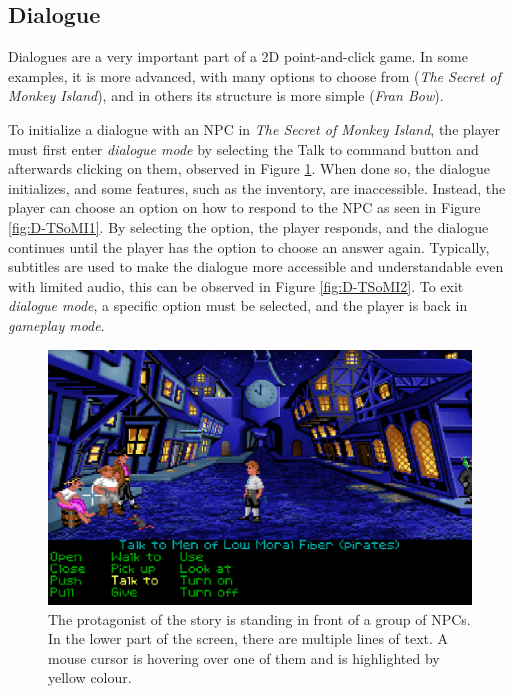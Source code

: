 \subsection{Dialogue}
\label{sec:Dialogue}Dialogues are a very important part of a 2D point-and-click game. In some examples, it is more advanced, with many options to choose from (\textit{The Secret of Monkey Island}), and in others its structure is more simple (\textit{Fran Bow}).  

To initialize a dialogue with an NPC in \textit{The Secret of Monkey Island}, the player must first enter \textit{dialogue mode} by selecting the Talk to command button and afterwards clicking on them, observed in Figure \ref{fig:D-TSoMI0}. When done so, the dialogue initializes, and some features, such as the inventory, are inaccessible. Instead, the player can choose an option on how to respond to the NPC as seen in Figure \ref{fig:D-TSoMI1}. By selecting the option, the player responds, and the dialogue continues until the player has the option to choose an answer again. Typically, subtitles are used to make the dialogue more accessible and understandable even with limited audio, this can be observed in Figure \ref{fig:D-TSoMI2}. To exit \textit{dialogue mode}, a specific option must be selected, and the player is back in \textit{gameplay mode}.

\begin{figure}[H]
\centering
\includegraphics[width=.8\linewidth]{img/D-TSoMI0.png}
\caption{The protagonist of the story is standing in front of a group of NPCs. In the lower part of the screen, there are multiple lines of text. A mouse cursor is hovering over one of them and is highlighted by yellow colour.}
\label{fig:D-TSoMI0}
\end{figure}

